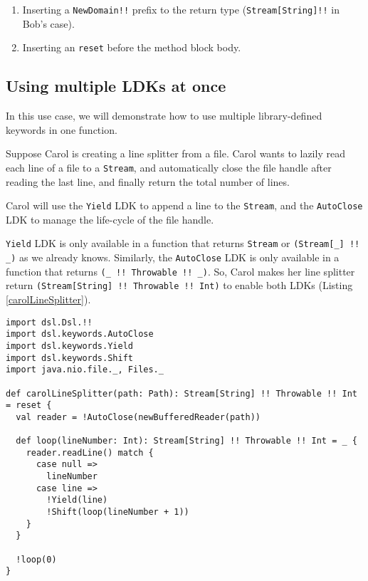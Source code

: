 \begin{enumerate}
  \item Inserting a \lstinline{NewDomain!!} prefix to the return type (\lstinline{Stream[String]!!} in Bob's case).
  \item Inserting an \lstinline{reset} before the method block body.
\end{enumerate}

\subsection{Using multiple LDKs at once}\label{Using multiple LDKs at once}

In this use case, we will demonstrate how to use multiple library-defined keywords in one function.

Suppose Carol is creating a line splitter from a file. Carol wants to lazily read each line of a file to a \lstinline{Stream}, and automatically close the file handle after reading the last line, and finally return the total number of lines.

Carol will use the \lstinline{Yield} LDK to append a line to the \lstinline{Stream}, and the \lstinline{AutoClose} LDK to manage the life-cycle of the file handle.

\lstinline{Yield} LDK is only available in a function that returns \lstinline{Stream} or \lstinline{(Stream[_] !! _)} as we already knows. Similarly, the \lstinline{AutoClose} LDK is only available in a function that returns \lstinline{(_ !! Throwable !! _)}. So, Carol makes her line splitter return \lstinline{(Stream[String] !! Throwable !! Int)} to enable both LDKs (Listing \ref{carolLineSplitter}).

\begin{lstlisting}[caption={Carol's line splitter},label={carolLineSplitter}]
import dsl.Dsl.!!
import dsl.keywords.AutoClose
import dsl.keywords.Yield
import dsl.keywords.Shift
import java.nio.file._, Files._

def carolLineSplitter(path: Path): Stream[String] !! Throwable !! Int = reset {
  val reader = !AutoClose(newBufferedReader(path))

  def loop(lineNumber: Int): Stream[String] !! Throwable !! Int = _ {
    reader.readLine() match {
      case null =>
        lineNumber
      case line =>
        !Yield(line)
        !Shift(loop(lineNumber + 1))
    }
  }

  !loop(0)
}
\end{lstlisting}


